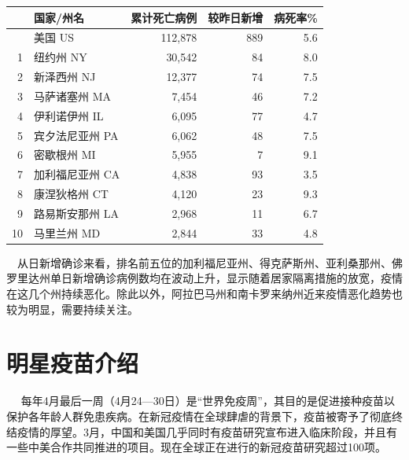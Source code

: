\documentclass[
]{article}
\begin{document}
\begin{table}[H]
\begin{minipage}{.6\linewidth}
\begin{table}[H]
\begin{tabular}{rlrrr}
\toprule
  & 国家/州名 & 累计死亡病例 & 较昨日新增 & 病死率\%\\
\midrule
\rowcolor{gray!6}   & 美国 US & 112,878 & 889 & 5.6\\
1 & 纽约州 NY & 30,542 & 84 & 8.0\\
\rowcolor{gray!6}  2 & 新泽西州 NJ & 12,377 & 74 & 7.5\\
3 & 马萨诸塞州 MA & 7,454 & 46 & 7.2\\
\rowcolor{gray!6}  4 & 伊利诺伊州 IL & 6,095 & 77 & 4.7\\
5 & 宾夕法尼亚州 PA & 6,062 & 48 & 7.5\\
\rowcolor{gray!6}  6 & 密歇根州 MI & 5,955 & 7 & 9.1\\
7 & 加利福尼亚州 CA & 4,838 & 93 & 3.5\\
\rowcolor{gray!6}  8 & 康涅狄格州 CT & 4,120 & 23 & 9.3\\
9 & 路易斯安那州 LA & 2,968 & 11 & 6.7\\
\rowcolor{gray!6}  10 & 马里兰州 MD & 2,844 & 33 & 4.8\\
\bottomrule
\end{tabular}
\endgroup{}
\end{table} \end{minipage} 
\end{table}

\(\quad\)从日新增确诊来看，排名前五位的加利福尼亚州、得克萨斯州、亚利桑那州、佛罗里达州单日新增确诊病例数均在波动上升，显示随着居家隔离措施的放宽，疫情在这几个州持续恶化。除此以外，阿拉巴马州和南卡罗来纳州近来疫情恶化趋势也较为明显，需要持续关注。

\vspace{5mm}

%
  \noindent{}%

\vspace{-5mm}

\hypertarget{section-4}{%
\section{\texorpdfstring{\textcolor{glaucous}{\Huge 明星疫苗介绍}}{}}\label{section-4}}

\vspace{-3mm}

\(\quad\)
每年4月最后一周（4月24---30日）是``世界免疫周''，其目的是促进接种疫苗以保护各年龄人群免患疾病。在新冠疫情在全球肆虐的背景下，疫苗被寄予了彻底终结疫情的厚望。3月，中国和美国几乎同时有疫苗研究宣布进入临床阶段，并且有一些中美合作共同推进的项目。现在全球正在进行的新冠疫苗研究超过100项。
\end{document}

